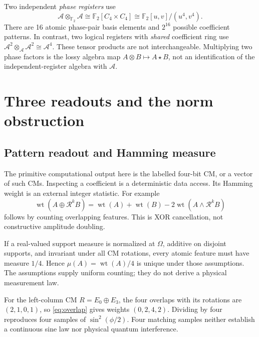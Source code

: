 \documentclass[11pt,a4paper]{article}
\theoremstyle{definition}\newtheorem{definition}[theorem]{Definition}
\theoremstyle{remark}\newtheorem{remark}[theorem]{Remark}
\newcommand{\F}{\mathbb F}
\newcommand{\alg}{\mathcal A}
\newcommand{\rot}{\mathcal R}
\newcommand{\wt}{\operatorname{wt}}
\numberwithin{equation}{section}
\begin{document}
Two independent \emph{phase registers} use
\begin{equation}
 \alg\otimes_{\F_2}\alg\cong
 \F_2[C_4\times C_4]\cong\F_2[u,v]/(u^4,v^4).
\end{equation}
There are 16 atomic phase-pair basis elements and $2^{16}$ possible coefficient patterns. In contrast, two logical registers with \emph{shared} coefficient ring use $\alg^2\otimes_{\alg}\alg^2\cong\alg^4$. These tensor products are not interchangeable. Multiplying two phase factors is the lossy algebra map $A\otimes B\mapsto A\star B$, not an identification of the independent-register algebra with $\alg$.

\section{Three readouts and the norm obstruction}\label{sec:norms}
\subsection{Pattern readout and Hamming measure}
The primitive computational output here is the labelled four-bit CM, or a vector of such CMs. Inspecting a coefficient is a deterministic data access. Its Hamming weight is an external integer statistic. For example
\begin{equation}\label{eq:overlap}
 \wt(A\oplus\rot^kB)=\wt(A)+\wt(B)-2\wt(A\land\rot^kB)
\end{equation}
follows by counting overlapping features. This is XOR cancellation, not constructive amplitude doubling.

If a real-valued support measure is normalized at $\Omega$, additive on disjoint supports, and invariant under all CM rotations, every atomic feature must have measure $1/4$. Hence $\mu(A)=\wt(A)/4$ is unique under those assumptions. The assumptions supply uniform counting; they do not derive a physical measurement law.

For the left-column CM $R=E_0\oplus E_3$, the four overlaps with its rotations are $(2,1,0,1)$, so \cref{eq:overlap} gives weights $(0,2,4,2)$. Dividing by four reproduces four samples of $\sin^2(\phi/2)$. Four matching samples neither establish a continuous sine law nor physical quantum interference.
\end{document}
